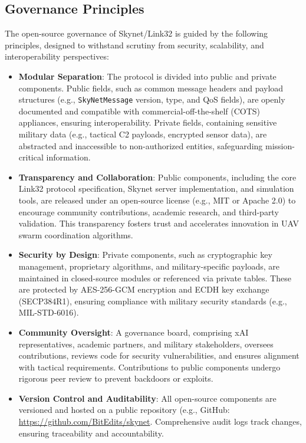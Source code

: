 \documentclass{article}
\begin{document}
\subsection{Governance Principles}
The open-source governance of Skynet/Link32 is guided by the following principles,
designed to withstand scrutiny from security, scalability, and interoperability perspectives:
\begin{itemize}
    \item \textbf{Modular Separation}: The protocol is divided into public and private components. Public fields, such as common message headers and payload structures (e.g., \texttt{SkyNetMessage} version, type, and QoS fields), are openly documented and compatible with commercial-off-the-shelf (COTS) appliances, ensuring interoperability. Private fields, containing sensitive military data (e.g., tactical C2 payloads, encrypted sensor data), are abstracted and inaccessible to non-authorized entities, safeguarding mission-critical information.
    \item \textbf{Transparency and Collaboration}: Public components, including the core Link32 protocol specification, Skynet server implementation, and simulation tools, are released under an open-source license (e.g., MIT or Apache 2.0) to encourage community contributions, academic research, and third-party validation. This transparency fosters trust and accelerates innovation in UAV swarm coordination algorithms.
    \item \textbf{Security by Design}: Private components, such as cryptographic key management, proprietary algorithms, and military-specific payloads, are maintained in closed-source modules or referenced via private tables. These are protected by AES-256-GCM encryption and ECDH key exchange (SECP384R1), ensuring compliance with military security standards (e.g., MIL-STD-6016).
    \item \textbf{Community Oversight}: A governance board, comprising xAI representatives, academic partners, and military stakeholders, oversees contributions, reviews code for security vulnerabilities, and ensures alignment with tactical requirements. Contributions to public components undergo rigorous peer review to prevent backdoors or exploits.
    \item \textbf{Version Control and Auditability}: All open-source components are versioned and hosted on a public repository (e.g., GitHub: \url{https://github.com/BitEdits/skynet}. Comprehensive audit logs track changes, ensuring traceability and accountability.
\end{itemize}
\end{document}
